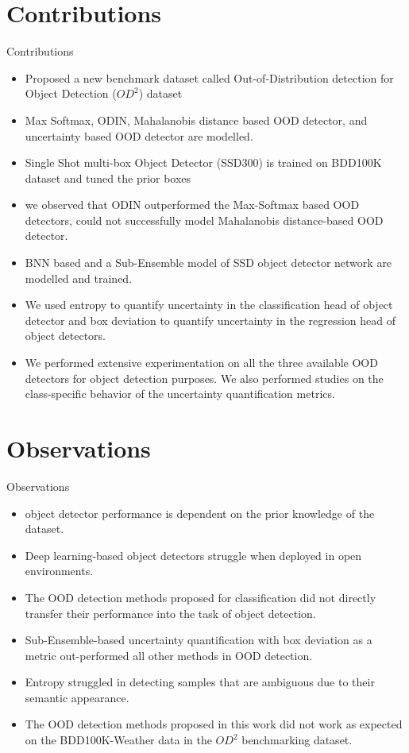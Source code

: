 \documentclass[10pt, aspectratio=169]{beamer}
\begin{document}
\section{Contributions}
\begin{frame}[allowframebreaks]{Contributions}
    \begin{itemize}
        \item Proposed a new benchmark dataset called Out-of-Distribution detection for Object Detection ($OD^2$) dataset
        \item Max Softmax, ODIN, Mahalanobis distance based OOD detector, and uncertainty based OOD detector are modelled.
        \item Single Shot multi-box Object Detector (SSD300) is trained on BDD100K dataset and tuned the prior boxes
        \item we observed that ODIN outperformed the Max-Softmax based OOD detectors, could not successfully model Mahalanobis distance-based OOD detector.
        \item BNN based and a Sub-Ensemble model of SSD object detector network are modelled and trained.
        \pagebreak
        \item We used entropy to quantify uncertainty in the classification head of object detector and box deviation to quantify uncertainty in the regression head of object detectors.
        \item We performed extensive experimentation on all the three available OOD detectors for object detection purposes. We also performed studies on the class-specific behavior of the uncertainty quantification metrics.
    \end{itemize}
\end{frame}

\section{Observations}
\begin{frame}[allowframebreaks]{Observations}
    \begin{itemize}
        \item object detector performance is dependent on the prior knowledge of the dataset. 
        \item Deep learning-based object detectors struggle when deployed in open environments.
        \item The OOD detection methods proposed for classification did not directly transfer their performance into the task of object detection.
        \item Sub-Ensemble-based uncertainty quantification with box deviation as a metric out-performed all other methods in OOD detection.
        \item Entropy struggled in detecting samples that are ambiguous due to their semantic appearance.
        \item The OOD detection methods proposed in this work did not work as expected on the BDD100K-Weather data in the $OD^2$ benchmarking dataset.
    \end{itemize}
\end{frame}
\end{document}
